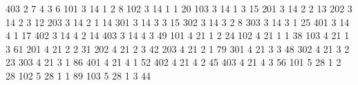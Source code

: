 \documentclass[]{book}
\newenvironment{Shaded}{\begin{snugshade}}{\end{snugshade}}
\newcommand{\DecValTok}[1]{\textcolor[rgb]{0.00,0.00,0.81}{#1}}
\begin{document}
\begin{Shaded}
\begin{Highlighting}[]
\DecValTok{403} \DecValTok{2}   \DecValTok{7}   \DecValTok{4}   \DecValTok{3}   \DecValTok{6}
\DecValTok{101} \DecValTok{3}   \DecValTok{14}  \DecValTok{1}   \DecValTok{2}   \DecValTok{8}
\DecValTok{102} \DecValTok{3}   \DecValTok{14}  \DecValTok{1}   \DecValTok{1}   \DecValTok{20}
\DecValTok{103} \DecValTok{3}   \DecValTok{14}  \DecValTok{1}   \DecValTok{3}   \DecValTok{15}
\DecValTok{201} \DecValTok{3}   \DecValTok{14}  \DecValTok{2}   \DecValTok{2}   \DecValTok{13}
\DecValTok{202} \DecValTok{3}   \DecValTok{14}  \DecValTok{2}   \DecValTok{3}   \DecValTok{12}
\DecValTok{203} \DecValTok{3}   \DecValTok{14}  \DecValTok{2}   \DecValTok{1}   \DecValTok{14}
\DecValTok{301} \DecValTok{3}   \DecValTok{14}  \DecValTok{3}   \DecValTok{3}   \DecValTok{15}
\DecValTok{302} \DecValTok{3}   \DecValTok{14}  \DecValTok{3}   \DecValTok{2}   \DecValTok{8}
\DecValTok{303} \DecValTok{3}   \DecValTok{14}  \DecValTok{3}   \DecValTok{1}   \DecValTok{25}
\DecValTok{401} \DecValTok{3}   \DecValTok{14}  \DecValTok{4}   \DecValTok{1}   \DecValTok{17}
\DecValTok{402} \DecValTok{3}   \DecValTok{14}  \DecValTok{4}   \DecValTok{2}   \DecValTok{14}
\DecValTok{403} \DecValTok{3}   \DecValTok{14}  \DecValTok{4}   \DecValTok{3}   \DecValTok{49}
\DecValTok{101} \DecValTok{4}   \DecValTok{21}  \DecValTok{1}   \DecValTok{2}   \DecValTok{24}
\DecValTok{102} \DecValTok{4}   \DecValTok{21}  \DecValTok{1}   \DecValTok{1}   \DecValTok{38}
\DecValTok{103} \DecValTok{4}   \DecValTok{21}  \DecValTok{1}   \DecValTok{3}   \DecValTok{61}
\DecValTok{201} \DecValTok{4}   \DecValTok{21}  \DecValTok{2}   \DecValTok{2}   \DecValTok{31}
\DecValTok{202} \DecValTok{4}   \DecValTok{21}  \DecValTok{2}   \DecValTok{3}   \DecValTok{42}
\DecValTok{203} \DecValTok{4}   \DecValTok{21}  \DecValTok{2}   \DecValTok{1}   \DecValTok{79}
\DecValTok{301} \DecValTok{4}   \DecValTok{21}  \DecValTok{3}   \DecValTok{3}   \DecValTok{48}
\DecValTok{302} \DecValTok{4}   \DecValTok{21}  \DecValTok{3}   \DecValTok{2}   \DecValTok{23}
\DecValTok{303} \DecValTok{4}   \DecValTok{21}  \DecValTok{3}   \DecValTok{1}   \DecValTok{86}
\DecValTok{401} \DecValTok{4}   \DecValTok{21}  \DecValTok{4}   \DecValTok{1}   \DecValTok{52}
\DecValTok{402} \DecValTok{4}   \DecValTok{21}  \DecValTok{4}   \DecValTok{2}   \DecValTok{45}
\DecValTok{403} \DecValTok{4}   \DecValTok{21}  \DecValTok{4}   \DecValTok{3}   \DecValTok{56}
\DecValTok{101} \DecValTok{5}   \DecValTok{28}  \DecValTok{1}   \DecValTok{2}   \DecValTok{28}
\DecValTok{102} \DecValTok{5}   \DecValTok{28}  \DecValTok{1}   \DecValTok{1}   \DecValTok{89}
\DecValTok{103} \DecValTok{5}   \DecValTok{28}  \DecValTok{1}   \DecValTok{3}   \DecValTok{44}

\end{Highlighting}
\end{Shaded}
\end{document}
